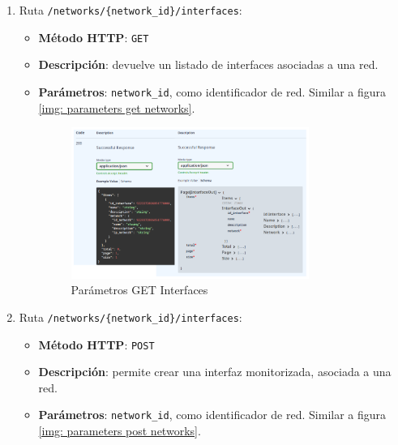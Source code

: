 \documentclass[a4paper, oneside, 12pt]{book}
\begin{document}
	\begin{enumerate}
		\item Ruta \texttt{/networks/\{network\_id\}/interfaces}:
	
		\begin{itemize}
			\item \textbf{Método HTTP}: \texttt{GET}
			\item \textbf{Descripción}: devuelve un listado de interfaces asociadas a una red.
			\item \textbf{Parámetros}: \texttt{network\_id}, como identificador de red. Similar a figura \ref{img: parameters get networks}.
			
			\begin{figure}[h!]
				\begin{center}
					\includegraphics[width=0.78\textwidth]{diag/response_get_interfaces.png}
					\caption{Parámetros GET Interfaces}
					\label{img: response get interfaces}
				\end{center}
			\end{figure}
		\end{itemize}
	
		\pagebreak
		
		\item Ruta \texttt{/networks/\{network\_id\}/interfaces}:
		
		\begin{itemize}
			\item \textbf{Método HTTP}: \texttt{POST}
			\item \textbf{Descripción}: permite crear una interfaz monitorizada, asociada a una red.
			\item \textbf{Parámetros}: \texttt{network\_id}, como identificador de red. Similar a figura \ref{img: parameters post networks}.
		

\end{itemize}
\end{enumerate}
\end{document}
